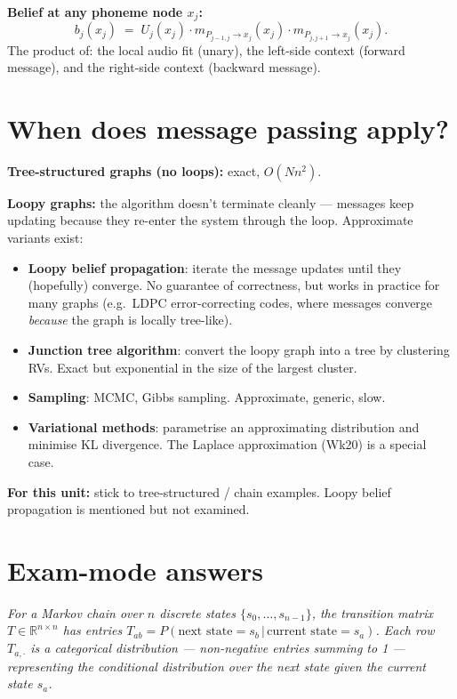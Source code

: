 \documentclass[11pt, a4paper]{article}
\begin{document}
\textbf{Belief at any phoneme node $x_j$:}
\[
b_j(x_j) \;=\; U_j(x_j) \cdot m_{P_{j-1,j}\to x_j}(x_j) \cdot m_{P_{j,j+1}\to x_j}(x_j).
\]
The product of: the local audio fit (unary), the left-side context (forward message), and the right-side context (backward message).

\section{When does message passing apply?}

\textbf{Tree-structured graphs (no loops):} exact, $O(Nn^2)$.

\textbf{Loopy graphs:} the algorithm doesn't terminate cleanly — messages keep updating because they re-enter the system through the loop. Approximate variants exist:
\begin{itemize}
  \item \textbf{Loopy belief propagation}: iterate the message updates until they (hopefully) converge. No guarantee of correctness, but works in practice for many graphs (e.g.\ LDPC error-correcting codes, where messages converge \emph{because} the graph is locally tree-like).
  \item \textbf{Junction tree algorithm}: convert the loopy graph into a tree by clustering RVs. Exact but exponential in the size of the largest cluster.
  \item \textbf{Sampling}: MCMC, Gibbs sampling. Approximate, generic, slow.
  \item \textbf{Variational methods}: parametrise an approximating distribution and minimise KL divergence. The Laplace approximation (Wk20) is a special case.
\end{itemize}

\textbf{For this unit:} stick to tree-structured / chain examples. Loopy belief propagation is mentioned but not examined.

\section{Exam-mode answers}

\begin{exambox}
\textit{For a Markov chain over $n$ discrete states $\{s_0, \ldots, s_{n-1}\}$, the transition matrix $T \in \mathbb{R}^{n\times n}$ has entries $T_{ab} = P(\text{next state}=s_b \,|\, \text{current state}=s_a)$. Each row $T_{a, \cdot}$ is a categorical distribution — non-negative entries summing to 1 — representing the conditional distribution over the next state given the current state $s_a$.}
\end{exambox}
\end{document}
